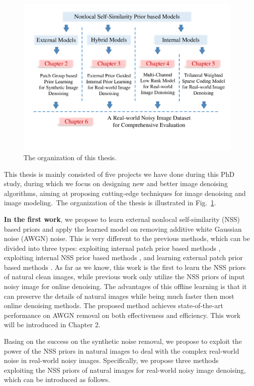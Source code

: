 \begin{figure}[t!]
\centering
\includegraphics[width=1\linewidth]{images/ThesisOrganization.pdf}
\vspace{-20mm}
\caption{The organization of this thesis.}
\label{fig1-1}
\end{figure}

This thesis is mainly consisted of five projects we have done during this PhD study, during which we focus on designing new and better image denoising algorithms, aiming at proposing cutting-edge techniques for image denoising and image modeling.\ The organization of the thesis is illustrated in Fig.\ \ref{fig1-1}.

\textbf{In the first work}, we propose to learn external nonlocal self-similarity (NSS) based priors and apply the learned model on removing additive white Gaussian noise (AWGN) noise. This is very different to the previous methods, which can be divided into three types: exploiting internal patch prior based methods \cite{ksvd,ple}, exploiting internal NSS prior based methods \cite{bm3d,lssc,ncsr,wnnm}, and learning external patch prior based methods \cite{epll}. As far as we know, this work is the first to learn the NSS priors of natural clean images, while previous work only utilize the NSS priors of input noisy image for online denoising. The advantages of this offline learning is that it can preserve the details of natural images while being much faster then most online denoising methods. The proposed method achieves state-of-the-art performance on AWGN removal on both effectiveness and efficiency. This work will be introduced in Chapter 2.

Basing on the success on the synthetic noise removal, we propose to exploit the power of the NSS priors in natural images to deal with the complex real-world noise in real-world noisy images. Specifically, we propose three methods exploiting the NSS priors of natural images for real-world noisy image denoising, which can be introduced as follows.

